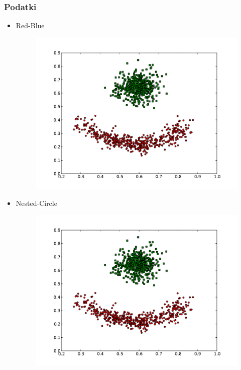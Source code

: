 \documentclass{beamer}
\begin{document}
\begin{frame}
\frametitle{Podatki}
    \begin{itemize}
    	\item Red-Blue
    		\begin{figure}[]
    			\includegraphics[scale=0.2]{red-blue-clusters.pdf}
    		\end{figure}
   	\item Nested-Circle
    		\begin{figure}[]
    			\includegraphics[scale=0.2]{red-blue-clusters.pdf}
    		\end{figure}
    \end{itemize}
\end{frame}
\end{document}
